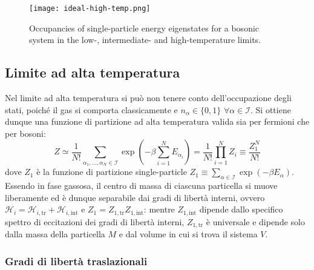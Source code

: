 \begin{figure}
	\centering
	\texttt{[image: ideal-high-temp.png]}
	\caption{Occupancies of single-particle energy eigenstates for a bosonic system in the low-, intermediate- and high-temperature limits.}
	\label{boson-temp}
\end{figure}

\subsection{Limite ad alta temperatura}

Nel limite ad alta temperatura si può non tenere conto dell'occupazione degli stati, poiché il gas si comporta classicamente e $ n_\alpha \in \{0,1\} \,\,\forall \alpha \in \mathcal{I} $. Si ottiene dunque una funzione di partizione ad alta temperatura valida sia per fermioni che per bosoni:
\begin{equation}
	Z \simeq \frac{1}{N!} \sum_{\alpha_1, \dots, \alpha_N \in \mathcal{I}} \exp \left( -\beta \sum_{i = 1}^N E_{\alpha_i} \right) = \frac{1}{N!} \prod_{i = 1}^N Z_i \equiv \frac{Z_1^N}{N!}
\end{equation}
dove $ Z_1 $ è la funzione di partizione single-particle $ Z_1 \equiv \sum_{\alpha \in \mathcal{I}} \exp \left( -\beta E_\alpha \right) $. \\
Essendo in fase gassosa, il centro di massa di ciascuna particella si muove liberamente ed è dunque separabile dai gradi di libertà interni, ovvero $ \mathcal{H}_i = \mathcal{H}_{i,\text{tr}} + \mathcal{H}_{i,\text{int}} $ e $ Z_1 = Z_{1,\text{tr}} Z_{1,\text{int}} $: mentre $ Z_{1,\text{int}} $ dipende dallo specifico spettro di eccitazioni dei gradi di libertà interni, $ Z_{1,\text{tr}} $ è universale e dipende solo dalla massa della particella $ M $ e dal volume in cui si trova il sistema $ V $.

\subsubsection{Gradi di libertà traslazionali}

